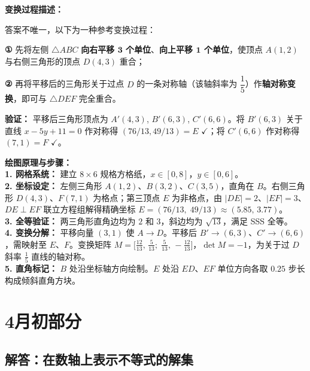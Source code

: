 \documentclass[12pt, a4paper]{ctexrep}
\begin{document}
\vspace{0.3cm}
\textbf{变换过程描述：}

答案不唯一，以下为一种参考变换过程：

\textbf{①} 先将左侧 $\triangle ABC$ \textbf{向右平移 $\mathbf{3}$ 个单位}、\textbf{向上平移 $\mathbf{1}$ 个单位}，使顶点 $A(1,2)$ 与右侧三角形的顶点 $D(4,3)$ 重合；

\textbf{②} 再将平移后的三角形关于过点 $D$ 的一条对称轴（该轴斜率为 $\dfrac{1}{5}$）作\textbf{轴对称变换}，即可与 $\triangle DEF$ 完全重合。

\vspace{0.2cm}
{\small
\textbf{验证：} 平移后三角形顶点为 $A'(4,3)$, $B'(6,3)$, $C'(6,6)$。将 $B'(6,3)$ 关于直线 $x - 5y + 11 = 0$ 作对称得 $(76/13, 49/13) = E$ $\checkmark$；将 $C'(6,6)$ 作对称得 $(7, 1) = F$ $\checkmark$。
}

\vspace{0.4cm}
{\small\color{blue!70!black}
\textbf{绘图原理与步骤：}\\
\textbf{1. 网格系统：} 建立 $8 \times 6$ 规格方格纸，$x \in [0,8]$，$y \in [0,6]$。\\
\textbf{2. 坐标设定：} 左侧三角形 $A(1,2)$、$B(3,2)$、$C(3,5)$，直角在 $B$。右侧三角形 $D(4,3)$、$F(7,1)$ 为格点；第三顶点 $E$ 为非格点，由 $|DE|=2$、$|EF|=3$、$DE \perp EF$ 联立方程组解得精确坐标 $E = (76/13,\; 49/13) \approx (5.85,\, 3.77)$。\\
\textbf{3. 全等验证：} 两三角形直角边均为 $2$ 和 $3$，斜边均为 $\sqrt{13}$，满足 SSS 全等。\\
\textbf{4. 变换分解：} 平移向量 $(3,1)$ 使 $A \to D$。平移后 $B' \to (6,3)$、$C' \to (6,6)$，需映射至 $E$、$F$。变换矩阵 $M = \bigl[\frac{12}{13},\, \frac{5}{13};\; \frac{5}{13},\, {-}\frac{12}{13}\bigr]$，$\det M = -1$，为关于过 $D$ 斜率 $\frac{1}{5}$ 直线的轴对称。\\
\textbf{5. 直角标记：} $B$ 处沿坐标轴方向绘制。$E$ 处沿 $ED$、$EF$ 单位方向各取 $0.25$ 步长构成倾斜直角方块。
}

\chapter{4月初部分}

\section{解答：在数轴上表示不等式的解集}
\end{document}
